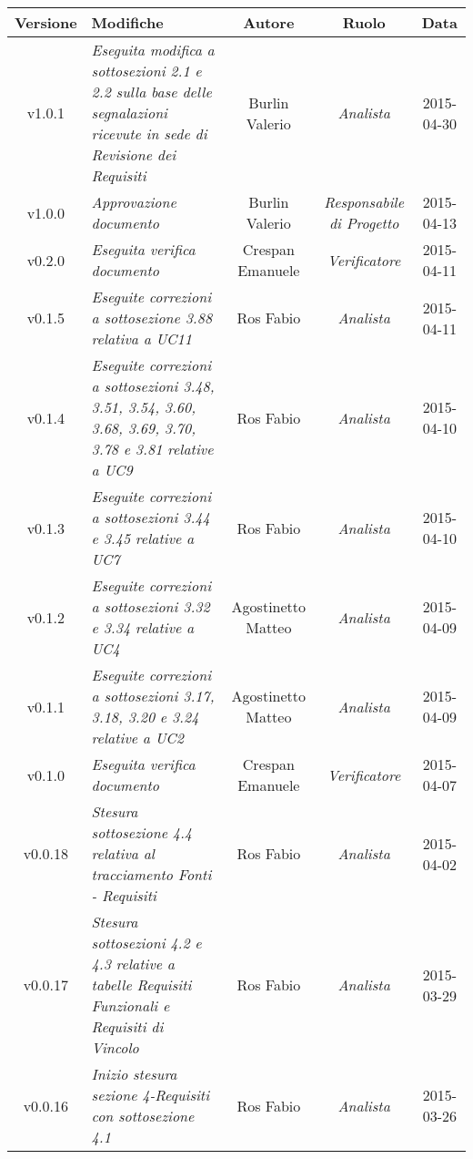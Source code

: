 \begin{table}[h]
\centering
\begin{tabular}{|c|p{}|c|c|c|}
	\toprule
		\textbf{Versione} & \textbf{Modifiche} & \textbf{Autore} & \textbf{Ruolo} & \textbf{Data}\\
	\midrule
	\midrule
		v1.0.1 & \textit{Eseguita modifica a sottosezioni 2.1 e 2.2 sulla base delle segnalazioni ricevute in sede di Revisione dei Requisiti} & Burlin Valerio & \textit{Analista} & 2015-04-30\\
	\midrule
		v1.0.0 & \textit{Approvazione documento} & Burlin Valerio & \textit{Responsabile di Progetto} & 2015-04-13\\
	\midrule
		v0.2.0 & \textit{Eseguita verifica documento} & Crespan Emanuele & \textit{Verificatore} & 2015-04-11\\
	\midrule
		v0.1.5 & \textit{Eseguite correzioni a sottosezione 3.88 relativa a UC11} & Ros Fabio & \textit{Analista} & 2015-04-11\\
	\midrule
		v0.1.4 & \textit{Eseguite correzioni a sottosezioni 3.48, 3.51, 3.54, 3.60, 3.68, 3.69, 3.70, 3.78  e 3.81 relative a UC9} & Ros Fabio & \textit{Analista} & 2015-04-10\\
	\midrule
		v0.1.3 & \textit{Eseguite correzioni a sottosezioni 3.44 e 3.45 relative a UC7} & Ros Fabio & \textit{Analista} & 2015-04-10\\
	\midrule
		v0.1.2 & \textit{Eseguite correzioni a sottosezioni 3.32 e 3.34 relative a UC4} & Agostinetto Matteo & \textit{Analista} & 2015-04-09\\
	\midrule
		v0.1.1 & \textit{Eseguite correzioni a sottosezioni 3.17, 3.18, 3.20 e 3.24 relative a UC2} & Agostinetto Matteo & \textit{Analista} & 2015-04-09\\
	\midrule
		v0.1.0 & \textit{Eseguita verifica documento} & Crespan Emanuele & \textit{Verificatore} & 2015-04-07\\
	\midrule
		v0.0.18 & \textit{Stesura sottosezione 4.4 relativa al tracciamento Fonti - Requisiti} & Ros Fabio & \textit{Analista} & 2015-04-02\\
	\midrule
		v0.0.17 & \textit{Stesura sottosezioni 4.2 e 4.3 relative a tabelle Requisiti Funzionali e Requisiti di Vincolo} & Ros Fabio & \textit{Analista} & 2015-03-29\\
	\midrule
		v0.0.16 & \textit{Inizio stesura sezione 4-Requisiti con sottosezione 4.1} & Ros Fabio & \textit{Analista} & 2015-03-26\\
	\bottomrule
\end{tabular}
\end{table}
